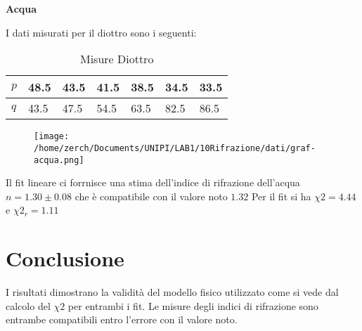 \documentclass[a4paper,10pt]{article}
\begin{document}
\textbf{Acqua}

I dati misurati per il diottro sono i seguenti:

\begin{table}[!htb]
\centering
\caption{Misure Diottro}
\label{my-labl}
\begin{tabular}{l|llllll}
$p$ & 48.5 & 43.5 & 41.5 & 38.5 & 34.5 & 33.5 \\ \hline
$q$ & 43.5 & 47.5 & 54.5 & 63.5 & 82.5 & 86.5
\end{tabular}
\end{table}
\pagebreak
 \begin {figure}[!htb]
\begin{center}
\texttt{[image: /home/zerch/Documents/UNIPI/LAB1/10Rifrazione/dati/graf-acqua.png]}
\end{center}
\end{figure}

Il fit lineare ci forrnisce una stima dell'indice di rifrazione dell'acqua $n= 1.30 \pm 0.08$ che è compatibile con il valore noto $1.32$ Per il fit si ha $\chi2=4.44$ e $\chi2_r=1.11$

\section{Conclusione}
I risultati dimostrano la validità del modello fisico utilizzato come si vede dal calcolo del $\chi2$ per entrambi i fit. Le misure degli indici di rifrazione sono entrambe compatibili entro l'errore con il valore noto.
\end{document}
